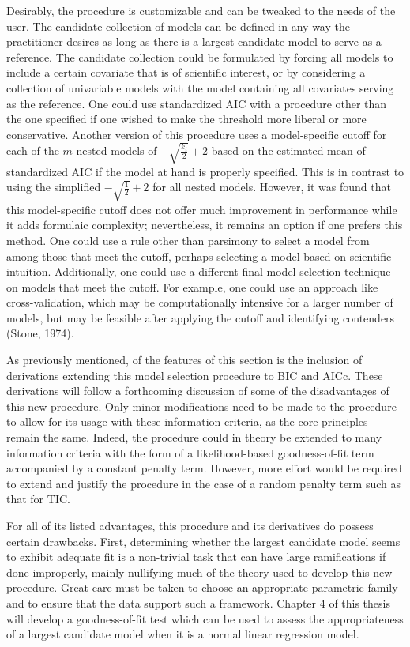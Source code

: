 		Desirably, the procedure is customizable and can be tweaked to the needs of the user. The candidate collection of models can be defined in any way the practitioner desires
		as long as there is a largest candidate model to serve as a reference. The candidate collection could be formulated by forcing all models to include a certain covariate that is of scientific
		interest, or by considering a collection of univariable models with the model containing all covariates serving as the reference. One could use standardized
		AIC with a procedure other than the one specified if one wished to make the threshold more liberal or more conservative. Another version of this procedure uses a model-specific
		cutoff for each of the $m$ nested models of $-\sqrt{\frac{k_i}{2}} + 2$ based on the estimated mean of standardized AIC if the model at hand is properly specified.
		This is in contrast to using the simplified $-\sqrt{\frac{1}{2}} + 2$ for all nested models. However, it was found that this model-specific cutoff does not offer much improvement in performance
		while it adds formulaic complexity; nevertheless, it remains an option if one prefers this method. One could use a rule other than parsimony to select a model
		from among those that meet the cutoff, perhaps selecting a model based on scientific intuition. Additionally, one could use a different final model selection technique on
		models that meet the cutoff. For example, one could use an approach like cross-validation, which may be computationally intensive for a larger number of models, but may be feasible after
		applying the cutoff and identifying contenders (Stone, 1974).

		As previously mentioned, of the features of this section is the inclusion of derivations extending this model selection procedure to BIC and
		AICc. These derivations will follow a forthcoming discussion of some of the disadvantages of this new procedure. Only minor modifications need to be made to the
		procedure to allow for its usage with these information criteria, as the core principles remain the same. Indeed, the procedure could in theory be extended to
		many information criteria with the form of a likelihood-based goodness-of-fit term accompanied by a constant penalty term. However, more effort would be required
		to extend and justify the procedure in the case of a random penalty term such as that for TIC.

		For all of its listed advantages, this procedure and its derivatives do possess certain drawbacks. First, determining whether the largest candidate
		model seems to exhibit adequate fit is a non-trivial task that can have large ramifications if done improperly, mainly nullifying much of the theory used to develop this
		new procedure. Great care must be taken to choose an appropriate parametric family and to ensure that the data support such a framework. Chapter 4 of this thesis will
		develop a goodness-of-fit test which can be used to assess the appropriateness of a largest candidate model when it is a normal linear regression model.

